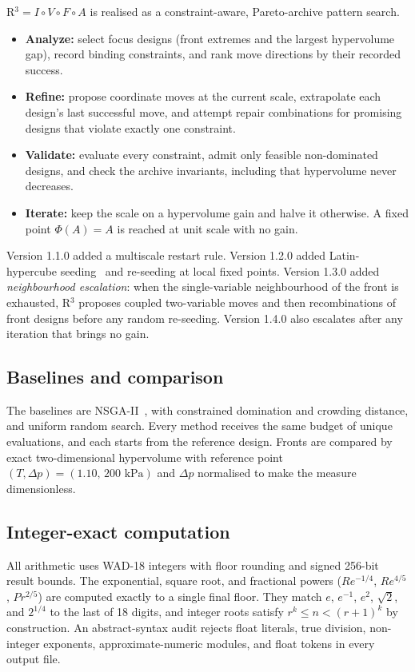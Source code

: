 \documentclass[11pt]{article}
\begin{document}
R$^3=I\circ V\circ F\circ A$ is realised as a constraint-aware, Pareto-archive pattern search.
\begin{itemize}[leftmargin=1.2em]
  \item \textbf{Analyze:} select focus designs (front extremes and the largest hypervolume gap),
  record binding constraints, and rank move directions by their recorded success.
  \item \textbf{Refine:} propose coordinate moves at the current scale, extrapolate each design's
  last successful move, and attempt repair combinations for promising designs that violate
  exactly one constraint.
  \item \textbf{Validate:} evaluate every constraint, admit only feasible non-dominated designs, and
  check the archive invariants, including that hypervolume never decreases.
  \item \textbf{Iterate:} keep the scale on a hypervolume gain and halve it otherwise. A fixed point
  $\Phi(A)=A$ is reached at unit scale with no gain.
\end{itemize}
Version 1.1.0 added a multiscale restart rule. Version 1.2.0 added Latin-hypercube seeding~\cite{McKay1979}
and re-seeding at local fixed points. Version 1.3.0 added \emph{neighbourhood escalation}: when the
single-variable neighbourhood of the front is exhausted, R$^3$ proposes coupled two-variable moves and
then recombinations of front designs before any random re-seeding. Version 1.4.0 also escalates after
any iteration that brings no gain.

\subsection{Baselines and comparison}

The baselines are NSGA-II~\cite{Deb2002}, with constrained domination and crowding distance, and
uniform random search. Every method receives the same budget of unique evaluations, and each
starts from the reference design. Fronts are compared by exact two-dimensional hypervolume with reference point
$(T,\Delta p)=(1.10,\,200\text{ kPa})$ and $\Delta p$ normalised to make the measure dimensionless.

\subsection{Integer-exact computation}

All arithmetic uses WAD-18 integers with floor rounding and signed 256-bit result bounds.
The exponential, square root, and fractional powers ($Re^{-1/4}$, $Re^{4/5}$, $Pr^{2/5}$) are
computed exactly to a single final floor. They match $e$, $e^{-1}$, $e^{2}$, $\sqrt2$, and
$2^{1/4}$ to the last of 18 digits, and integer roots satisfy $r^k\le n<(r+1)^k$ by construction.
An abstract-syntax audit rejects float literals, true division, non-integer exponents,
approximate-numeric modules, and float tokens in every output file.
\end{document}
